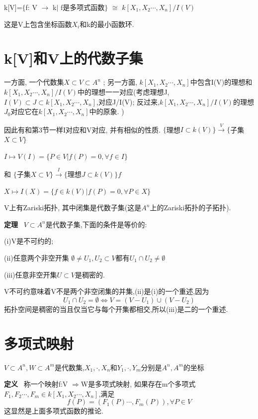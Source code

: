 \documentclass[UTF8]{book}
\begin{document}
		\center  k[V]=$\{$f: V  $\rightarrow$  k$\vert$ f是多项式函数$\}$ $\cong $ $k[X_{1},X_{2}\cdots,X_{n}]/I(V)$


\justifying	
这是V上包含坐标函数$X_{i}$和k的最小函数环.


\section{k[V]和V上的代数子集} 一方面, 一个代数集$X\subset V\subset A^{n}$ ; 另一方面, $k[X_{1},X_{2}\cdots,X_{n}]$中包含I(V)的理想和$ k[X_{1},X_{2}\cdots,X_{n}]/I(V)$中的理想一一对应(考虑理想J,$I(V) \subset J \subset k[X_{1},X_{2}\cdots,X_{n}]$,对应J/I(V); 反过来,$k[X_{1},X_{2}\cdots,X_{n}]/I(V)$的理想$J_{0}$对应它在$k[X_{1},X_{2}\cdots,X_{n}]$中的原象. )

因此有和第3节一样I对应和V对应, 并有相似的性质.
       \center  $\{$理想$I\subset k(V)\}\stackrel{V}{\longrightarrow} \{$子集$X\subset V \}$



      $ I \longmapsto V(I)=\{P\in V\vert f(P)=0,\forall f \in I \}$

\justifying
和
    \center  $\{$子集$X\subset V \}\stackrel{I}{\longrightarrow} \{$理想$J\subset k(V)\}f$


       $ X \longmapsto I(X)=\{f\in k(V)\vert f(P)=0,\forall P \in X\}$

\justifying
V上有Zariski拓扑, 其中闭集是代数子集(这是$A^{n}$上的Zariski拓扑的子拓扑).

\textbf{定理} \ $V\subset A^{n}$是代数子集,下面的条件是等价的:

(i)V是不可约的;

(ii)任意两个非空开集 $\emptyset \neq U_{1},U_{2} \subset V $都有$U_{1} \cap U_{2}\neq \emptyset$

(iii)任意非空开集$U\subset V$是稠密的.

V不可约意味着V不是两个非空闭集的并集,(ii)是(i)的一个重述,因为
\begin{equation*}
U_{1}\cap U_{2}=\emptyset \Longleftrightarrow V=(V-U_{1})\cup (V-U_{2})
\end{equation*}
拓扑空间是稠密的当且仅当它与每个开集都相交,所以(iii)是二的一个重述.

\section{多项式映射} $V\subset A^{n},W\subset A^{m}$是代数集,$X_{1},\cdot,X_{n}$和$Y_{1},\cdot,Y_{m}$分别是$A^{n},A^{m}$的坐标

\textbf{定义} \ 称一个映射f:V $\Rightarrow $W是多项式映射, 如果存在m个多项式$F_{1},F_{2}\cdots,F_{m}\in k[X_{1},X_{2}\cdots,X_{n}]$,满足
\begin{equation*}
f(P)=(F_{1}(P)\cdots,F_{m}(P)), \forall  P\in V
\end{equation*}
这显然是上面多项式函数的推论.
\end{document}

